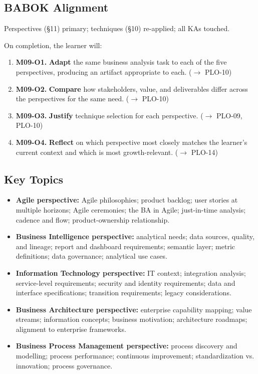 \documentclass[11pt,letterpaper,oneside]{report}
\begin{document}
\subsection*{BABOK Alignment}
Perspectives (\S11) primary; techniques (\S10) re-applied; all KAs touched.

\begin{outcomes}
On completion, the learner will:
\begin{enumerate}
  \item \textbf{M09-O1.} \textbf{Adapt} the same business analysis task to each of the five perspectives, producing an artifact appropriate to each. ($\to$ PLO-10)
  \item \textbf{M09-O2.} \textbf{Compare} how stakeholders, value, and deliverables differ across the perspectives for the same need. ($\to$ PLO-10)
  \item \textbf{M09-O3.} \textbf{Justify} technique selection for each perspective. ($\to$ PLO-09, PLO-10)
  \item \textbf{M09-O4.} \textbf{Reflect} on which perspective most closely matches the learner's current context and which is most growth-relevant. ($\to$ PLO-14)
\end{enumerate}
\end{outcomes}

\subsection*{Key Topics}
\begin{itemize}
  \item \textbf{Agile perspective:} Agile philosophies; product backlog; user stories at multiple horizons; Agile ceremonies; the BA in Agile; just-in-time analysis; cadence and flow; product-ownership relationship.
  \item \textbf{Business Intelligence perspective:} analytical needs; data sources, quality, and lineage; report and dashboard requirements; semantic layer; metric definitions; data governance; analytical use cases.
  \item \textbf{Information Technology perspective:} IT context; integration analysis; service-level requirements; security and identity requirements; data and interface specifications; transition requirements; legacy considerations.
  \item \textbf{Business Architecture perspective:} enterprise capability mapping; value streams; information concepts; business motivation; architecture roadmaps; alignment to enterprise frameworks.
  \item \textbf{Business Process Management perspective:} process discovery and modelling; process performance; continuous improvement; standardization vs. innovation; process governance.
\end{itemize}
\end{document}
